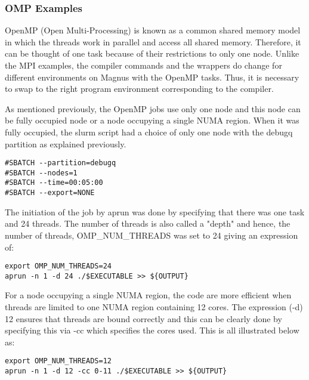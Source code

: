 \subsubsection{OMP Examples}

OpenMP (Open Multi-Processing) is known as a common shared memory model in which the threads work in parallel and access all shared memory. Therefore,
it can be thought of one task because of their restrictions to only one node. Unlike the MPI examples, the compiler commands and the wrappers do change 
for different environments on Magnus with the OpenMP tasks. Thus, it is necessary to swap to the right program environment corresponding to the compiler.

As mentioned previously, the OpenMP jobs use only one node and this node can be fully occupied node or a node occupying a single NUMA region. When it was 
fully occupied, the slurm script had a choice of only one node with the debugq partition as explained previously.

\begin{tcolorbox}
\begin{Verbatim}[fontsize=\scriptsize]
#SBATCH --partition=debugq
#SBATCH --nodes=1
#SBATCH --time=00:05:00
#SBATCH --export=NONE
\end{Verbatim}
\end{tcolorbox}

The initiation of the job by aprun was done by specifying that there was one task and 24 threads. The number of threads is also called a "depth" and 
hence, the number of threads, OMP\_NUM\_THREADS was set to 24 giving an expression of:

\begin{tcolorbox}
\begin{Verbatim}[fontsize=\scriptsize]
export OMP_NUM_THREADS=24
aprun -n 1 -d 24 ./$EXECUTABLE >> ${OUTPUT}
\end{Verbatim}
\end{tcolorbox}

For a node occupying a single NUMA region, the code are more efficient when threads are limited to one NUMA region containing 12 cores. The expression 
(-d) 12 ensures that threads are bound correctly and this can be clearly done by specifying this via -cc which specifies the cores used. This is all 
illustrated below as:

\begin{tcolorbox}
\begin{Verbatim}[fontsize=\scriptsize]
export OMP_NUM_THREADS=12
aprun -n 1 -d 12 -cc 0-11 ./$EXECUTABLE >> ${OUTPUT}
\end{Verbatim}
\end{tcolorbox}

